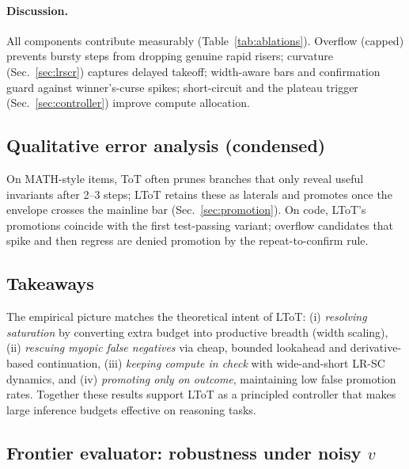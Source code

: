 \documentclass{article}
\begin{document}
\paragraph{Discussion.}
All components contribute measurably (Table~\ref{tab:ablations}).
Overflow (capped) prevents bursty steps from dropping genuine rapid risers; curvature (Sec.~\ref{sec:lrscr}) captures delayed takeoff; width-aware bars and confirmation guard against winner's-curse spikes; short-circuit and the plateau trigger (Sec.~\ref{sec:controller}) improve compute allocation.

\subsection{Qualitative error analysis (condensed)}
\label{subsec:qualitative}
On MATH-style items, ToT often prunes branches that only reveal useful invariants after 2--3 steps; LToT retains these as laterals and promotes once the envelope crosses the mainline bar (Sec.~\ref{sec:promotion}).
On code, LToT's promotions coincide with the first test-passing variant; overflow candidates that spike and then regress are denied promotion by the repeat-to-confirm rule.

\subsection{Takeaways}
\label{subsec:takeaways}
The empirical picture matches the theoretical intent of LToT:
(i) \emph{resolving saturation} by converting extra budget into productive breadth (width scaling),
(ii) \emph{rescuing myopic false negatives} via cheap, bounded lookahead and derivative-based continuation,
(iii) \emph{keeping compute in check} with wide-and-short LR-SC dynamics, and
(iv) \emph{promoting only on outcome}, maintaining low false promotion rates.
Together these results support LToT as a principled controller that makes large inference budgets effective on reasoning tasks.

\subsection{Frontier evaluator: robustness under noisy $v$}
\label{subsec:frontier-results-noisy}
\end{document}

